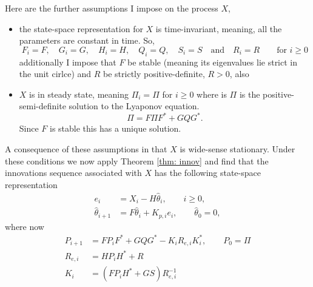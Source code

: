 \documentclass[12pt]{amsart}
\begin{document}
Here are the further assumptions I impose on the process $X$, 
\begin{itemize}
	\item the state-space representation for $X$ is time-invariant, meaning, all the parameters are constant in time. So,
	$$F_i = F,\quad G_i=G, \quad H_i = H,\quad Q_i=Q, \quad S_i=S \quad\text{and}\quad R_i = R\qquad \text{for }i\ge 0$$
	additionally I impose that $F$ be stable (meaning its eigenvalues lie strict in the unit cirlce) and $R$ be strictly positive-definite, $R>0$, also 
	\item $X$ is in  steady state, meaning $\Pi_i = \Pi$ for $i\ge 0$ where is $\Pi$ is the positive-semi-definite solution to the Lyaponov equation. 
	$$\Pi = F\Pi F^* + GQG^*.$$
	 Since $F$ is stable this has a unique solution. 
\end{itemize}
A consequence of these assumptions in that $X$ is wide-sense stationary.
Under these conditions we now apply Theorem \ref{thm: innov} and find that the innovations sequence associated with $X$ has the following state-space representation 
\begin{subequations}
	\label{equ: innovations stationary}
	\begin{align}
	e_i &= X_i - H\hat{\theta}_i, \qquad i \ge 0,\\
	\hat{\theta}_{i+1} &= F\hat{\theta}_{i} + K_{p,i}e_i,\qquad \hat{\theta}_0 = 0,	
	\end{align}
\end{subequations}
	where now
	\begin{subequations}
	\label{equ: Kal stationary}
	\begin{align}
	\label{equ: Kal stationary Pi}  P_{i+1} &= FP_{i}F^* + GQG^* - K_iR_{e,i}K^*_i,\qquad P_0 = \Pi \\
	\label{equ: Kal stationary Rei} R_{e,i} &= HP_iH^* + R \\
	\label{equ: Kal stationary Ki}  K_i &= (FP_iH^* + GS) R_{e,i}^{-1}
	\end{align}
\end{subequations}
\end{document}
